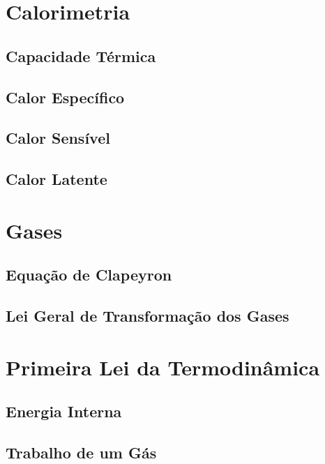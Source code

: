 \section{Calorimetria}

\subsection{Capacidade Térmica}

\subsection{Calor Específico}

\subsection{Calor Sensível}

\subsection{Calor Latente}




\section{Gases}

\subsection{Equação de Clapeyron}

\subsection{Lei Geral de Transformação dos Gases}






\section{Primeira Lei da Termodinâmica}

\subsection{Energia Interna}

\subsection{Trabalho de um Gás}

